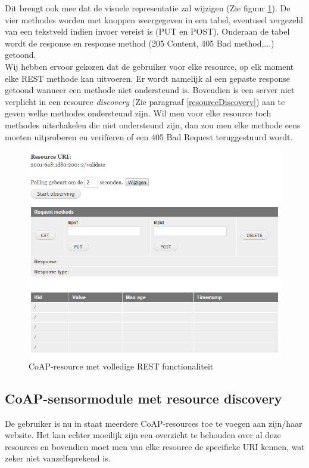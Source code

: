 Dit brengt ook mee dat de visuele representatie zal wijzigen (Zie figuur \ref{fig:rest}). De vier methodes worden met knoppen weergegeven in een tabel, eventueel vergezeld van een tekstveld indien invoer vereist is (PUT en POST). Onderaan de tabel wordt de response en response method (205 Content, 405 Bad method,...) getoond.\\
Wij hebben ervoor gekozen dat de gebruiker voor elke resource, op elk moment elke REST methode kan uitvoeren. Er wordt namelijk al een gepaste response getoond wanneer een methode niet ondersteund is. Bovendien is een server niet verplicht in een resource \textit{discovery} (Zie paragraaf \ref{resourceDiscovery}) aan te geven welke methodes ondersteund zijn. Wil men voor elke resource toch methodes uitschakelen die niet ondersteund zijn, dan zou men elke methode eens moeten uitproberen en verif\"{i}eren of een 405 Bad Request teruggestuurd wordt.

\begin{figure}[h!]
\centering
\includegraphics[width=1\textwidth]{fig/rest}
\caption{CoAP-resource met volledige REST functionaliteit}
\label{fig:rest}
\end{figure}

\subsection{CoAP-sensormodule met resource discovery}
De gebruiker is nu in staat meerdere CoAP-resources toe te voegen aan zijn/haar website. Het kan echter moeilijk zijn een overzicht te behouden over al deze resources en bovendien moet men van elke resource de specifieke URI kennen, wat zeker niet vanzelfsprekend is.\\

